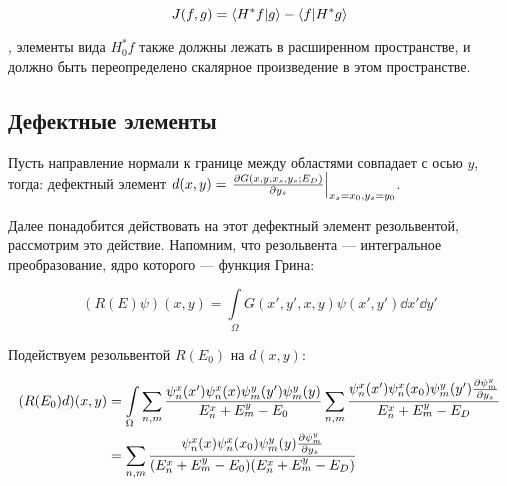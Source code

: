 \[
J(f, g) = \ip{H^* f}{g} - \ip{f}{H^* g}
\]

, элементы вида $H_0^* f$ также должны лежать в расширенном пространстве, и должно быть переопределено скалярное произведение в этом пространстве.








\subsection{Дефектные элементы}
Пусть направление нормали к границе между областями совпадает с осью $y$, тогда: дефектный элемент $d(x, y) = \eval{\pdv{G(x, y, x_s, y_s; E_D)}{y_s}}_{x_s = x_0, y_s = y_0}$.

Далее понадобится действовать на этот дефектный элемент резольвентой, рассмотрим это действие. Напомним, что резольвента — интегральное преобразование, ядро которого — функция Грина:

$$(R(E) \psi)(x, y) = \int\limits_\Omega G(x', y', x, y) \psi(x', y') \dd{x'} \dd{y'}$$

Подействуем резольвентой $R(E_0)$ на $d(x, y)$:

\begin{align*}
(R(E_0) d)(x, y)
&= \int\limits_\Omega \sum\limits_{n, m} \frac{\psi^x_n(x') \psi^x_n(x) \psi^y_m(y') \psi^y_m(y)}{E^x_n + E^y_m - E_0} \sum\limits_{n, m} \frac{\psi_n^x(x') \psi_n^x(x_0) \psi_m^y(y') \pdv{\psi_m^y}{y_s} (y_0)}{E^x_n + E^y_m - E_D} \\
&= \sum\limits_{n, m} \frac{\psi_n^x(x) \psi_n^x(x_0) \psi_m^y(y) \pdv{\psi_m^y}{y_s} (y_0)}{(E^x_n + E^y_m - E_0)(E^x_n + E^y_m - E_D)} \\
\end{align*}

